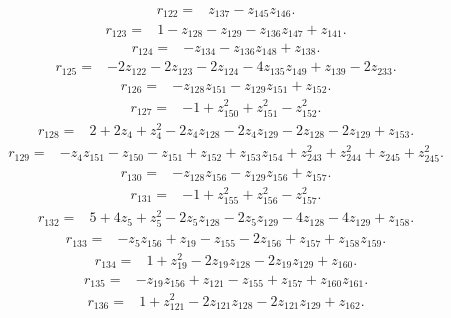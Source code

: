 \begin{align*}
 r_{122}={}&z_{137}-z_{145}z_{146} .
\end{align*}
\begin{align*}
 r_{123}={}&1-z_{128}-z_{129}-z_{136}z_{147}+z_{141} .
\end{align*}
\begin{align*}
 r_{124}={}&-z_{134}-z_{136}z_{148}+z_{138} .
\end{align*}
\begin{align*}
 r_{125}={}&-2z_{122}-2z_{123}-2z_{124}-4z_{135}z_{149}+z_{139}-2z_{233} .
\end{align*}
\begin{align*}
 r_{126}={}&-z_{128}z_{151}-z_{129}z_{151}+z_{152} .
\end{align*}
\begin{align*}
 r_{127}={}&-1+z_{150}^{2}+z_{151}^{2}-z_{152}^{2} .
\end{align*}
\begin{align*}
 r_{128}={}&2+2z_{4}+z_{4}^{2}-2z_{4}z_{128}-2z_{4}z_{129}-2z_{128}-2z_{129}+z_{153} .
\end{align*}
\begin{align*}
 r_{129}={}&-z_{4}z_{151}-z_{150}-z_{151}+z_{152}+z_{153}z_{154}+z_{243}^{2}+z_{244}^{2}+z_{245}+z_{245}^{2} .
\end{align*}
\begin{align*}
 r_{130}={}&-z_{128}z_{156}-z_{129}z_{156}+z_{157} .
\end{align*}
\begin{align*}
 r_{131}={}&-1+z_{155}^{2}+z_{156}^{2}-z_{157}^{2} .
\end{align*}
\begin{align*}
 r_{132}={}&5+4z_{5}+z_{5}^{2}-2z_{5}z_{128}-2z_{5}z_{129}-4z_{128}-4z_{129}+z_{158} .
\end{align*}
\begin{align*}
 r_{133}={}&-z_{5}z_{156}+z_{19}-z_{155}-2z_{156}+z_{157}+z_{158}z_{159} .
\end{align*}
\begin{align*}
 r_{134}={}&1+z_{19}^{2}-2z_{19}z_{128}-2z_{19}z_{129}+z_{160} .
\end{align*}
\begin{align*}
 r_{135}={}&-z_{19}z_{156}+z_{121}-z_{155}+z_{157}+z_{160}z_{161} .
\end{align*}
\begin{align*}
 r_{136}={}&1+z_{121}^{2}-2z_{121}z_{128}-2z_{121}z_{129}+z_{162} .
\end{align*}
